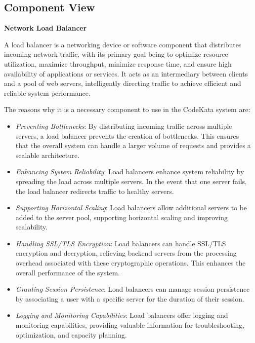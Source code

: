 \subsection{Component View}
\textbf{Network Load Balancer}

A load balancer is a networking device or software component that distributes incoming network traffic, with its primary goal being to optimize resource utilization, maximize throughput, minimize response time, and ensure high availability of applications or services. It acts as an intermediary between clients and a pool of web servers, intelligently directing traffic to achieve efficient and reliable system performance.

The reasons why it is a necessary component to use in the CodeKata system are:

\begin{itemize}
    \item \textit{Preventing Bottlenecks}: By distributing incoming traffic across multiple servers, a load balancer prevents the creation of bottlenecks. This ensures that the overall system can handle a larger volume of requests and provides a scalable architecture.
    
    \item \textit{Enhancing System Reliability}: Load balancers enhance system reliability by spreading the load across multiple servers. In the event that one server fails, the load balancer redirects traffic to healthy servers.
    
    \item \textit{Supporting Horizontal Scaling}: Load balancers allow additional servers to be added to the server pool, supporting horizontal scaling and improving scalability.
    
    \item \textit{Handling SSL/TLS Encryption}: Load balancers can handle SSL/TLS encryption and decryption, relieving backend servers from the processing overhead associated with these cryptographic operations. This enhances the overall performance of the system.
    
    \item \textit{Granting Session Persistence}: Load balancers can manage session persistence by associating a user with a specific server for the duration of their session.
    
    \item \textit{Logging and Monitoring Capabilities}: Load balancers offer logging and monitoring capabilities, providing valuable information for troubleshooting, optimization, and capacity planning.
\end{itemize}
